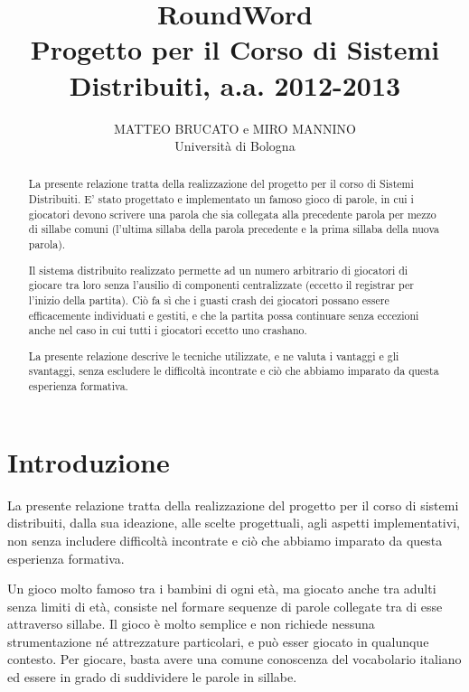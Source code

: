 \documentclass[9pt]{article}
\title{RoundWord\\
\large{Progetto per il Corso di Sistemi Distribuiti, a.a. 2012-2013}}
\author{MATTEO BRUCATO e MIRO MANNINO\\Università di Bologna}
\begin{document}
\maketitle

\begin{abstract}

La presente relazione tratta della realizzazione del progetto per il corso di Sistemi Distribuiti. E' stato progettato e implementato un famoso gioco di parole, in cui i giocatori devono scrivere una parola che sia collegata alla precedente parola per mezzo di sillabe comuni (l'ultima sillaba della parola precedente e la prima sillaba della nuova parola).

Il sistema distribuito realizzato permette ad un numero arbitrario di giocatori di giocare tra loro senza l'ausilio di componenti centralizzate (eccetto il registrar per l'inizio della partita). Ciò fa sì che i guasti crash dei giocatori possano essere efficacemente individuati e gestiti, e che la partita possa continuare senza eccezioni anche nel caso in cui tutti i giocatori eccetto uno crashano.

La presente relazione descrive le tecniche utilizzate, e ne valuta i vantaggi e gli svantaggi, senza escludere le difficoltà incontrate e ciò che abbiamo imparato da questa esperienza formativa.


\end{abstract}


\tableofcontents

\newpage
\section{Introduzione}

La presente relazione tratta della realizzazione del progetto per il corso di sistemi distribuiti, dalla sua ideazione, alle scelte progettuali, agli aspetti implementativi, non senza includere difficoltà incontrate e ciò che abbiamo imparato da questa esperienza formativa.

Un gioco molto famoso tra i bambini di ogni età, ma giocato anche tra adulti senza limiti di età, consiste nel formare sequenze di parole collegate tra di esse attraverso sillabe. Il gioco è molto semplice e non richiede nessuna strumentazione né attrezzature particolari, e può esser giocato in qualunque contesto. Per giocare, basta avere una comune conoscenza del vocabolario italiano ed essere in grado di suddividere le parole in sillabe. 
\end{document}
